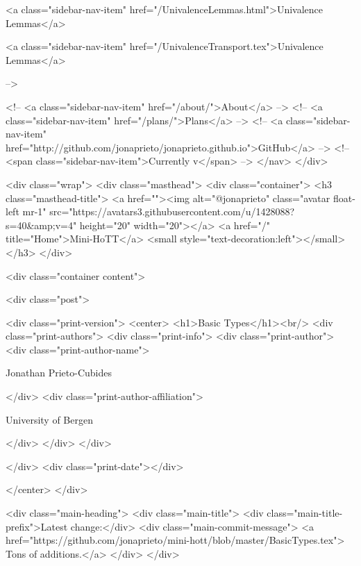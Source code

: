       
    
      
        
          <a class="sidebar-nav-item" href="/UnivalenceLemmas.html">Univalence Lemmas</a>
        
      
    
      
        
          <a class="sidebar-nav-item" href="/UnivalenceTransport.tex">Univalence Lemmas</a>
        
      
     -->

    <!-- <a class="sidebar-nav-item" href="/about/">About</a> -->
    <!-- <a class="sidebar-nav-item" href="/plans/">Plans</a> -->
    <!-- <a class="sidebar-nav-item" href="http://github.com/jonaprieto/jonaprieto.github.io">GitHub</a> -->
    <!-- <span class="sidebar-nav-item">Currently v</span> -->
  </nav>
</div>

    <div class="wrap">
      <div class="masthead">
        <div class="container">
          <h3 class="masthead-title">
            <a href=""><img alt="@jonaprieto" class="avatar float-left mr-1" src="https://avatars3.githubusercontent.com/u/1428088?s=40&amp;v=4" height="20" width="20"></a>
            <a href="/" title="Home">Mini-HoTT</a>
            <small style="text-decoration:left"></small>
          </h3>
        </div>
      
      <div class="container content">
        







<div class="post">

  <div class="print-version">
    <center>
      <h1>Basic Types</h1><br/>
        <div class="print-authors">
          <div class="print-info">
            <div class="print-author">
              <div class="print-author-name">
                
                  Jonathan Prieto-Cubides
                
              </div>
              <div class="print-author-affiliation">
                
                  University of Bergen
                
                </div>
            </div>
          </div>
          
          
        </div>
        <div class="print-date"></div>
        
        
    </center>
  </div>

  
  <div class="main-heading">
    <div class="main-title">
      <div class="main-title-prefix">Latest change:</div>
      <div class="main-commit-message">
            <a href="https://github.com/jonaprieto/mini-hott/blob/master/BasicTypes.tex">
              Tons of additions.</a>
      </div>
    </div>

